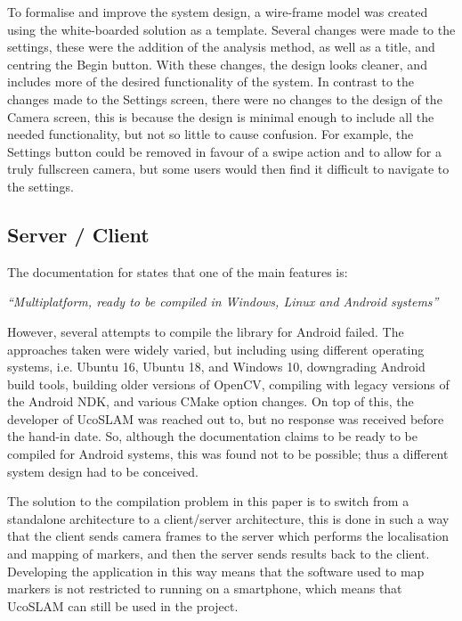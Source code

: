 To formalise and improve the system design, a wire-frame model was created using the white-boarded solution as a template. Several changes were made to the settings, these were the addition of the analysis method, as well as a title, and centring the Begin button. With these changes, the design looks cleaner, and includes more of the desired functionality of the system. In contrast to the changes made to the Settings screen, there were no changes to the design of the Camera screen, this is because the design is minimal enough to include all the needed functionality, but not so little to cause confusion. For example, the Settings button could be removed in favour of a swipe action and to allow for a truly fullscreen camera, but some users would then find it difficult to navigate to the settings.

\subsection{Server / Client}

The documentation for \citet{ucoslam} states that one of the main features is:

\begin{displayquote}
\textit{``Multiplatform, ready to be compiled in Windows, Linux and Android systems''}
\end{displayquote}

However, several attempts to compile the library for Android failed. The approaches taken were widely varied, but including using different operating systems, i.e. Ubuntu 16, Ubuntu 18, and Windows 10, downgrading Android build tools, building older versions of OpenCV, compiling with legacy versions of the Android NDK, and various CMake option changes. On top of this, the developer of UcoSLAM was reached out to, but no response was received before the hand-in date. So, although the documentation claims to be ready to be compiled for Android systems, this was found not to be possible; thus a different system design had to be conceived.

The solution to the compilation problem in this paper is to switch from a standalone architecture to a client/server architecture, this is done in such a way that the client sends camera frames to the server which performs the localisation and mapping of markers, and then the server sends results back to the client. Developing the application in this way means that the software used to map markers is not restricted to running on a smartphone, which means that UcoSLAM can still be used in the project.

